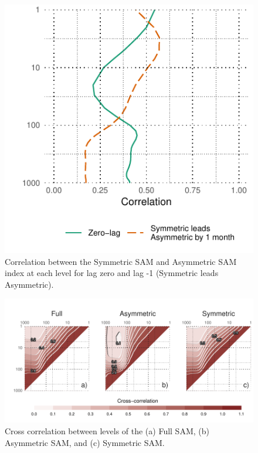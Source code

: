 \documentclass[]{ametsocV5}
\begin{document}
\begin{figure}
\includegraphics{cor-lev-1} \caption[Correlation between the Symmetric SAM and Asymmetric SAM index at each level for lag zero and lag -1 (Symmetric leads Asymmetric)]{Correlation between the Symmetric SAM and Asymmetric SAM index at each level for lag zero and lag -1 (Symmetric leads Asymmetric).}\label{fig:cor-lev}
\end{figure}

\begin{figure}
\includegraphics{cross-correlation-1} \caption[Cross correlation between levels of the (a) Full SAM, (b) Asymmetric SAM, and (c) Symmetric SAM]{Cross correlation between levels of the (a) Full SAM, (b) Asymmetric SAM, and (c) Symmetric SAM.}\label{fig:cross-correlation}
\end{figure}
\end{document}

